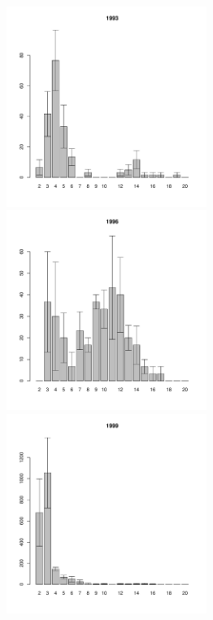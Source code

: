 \documentclass[12pt, a4paper]{article}
\begin{document}
\begin{figure}[h]
\begin{multicols}{3}
\end{multicols}



\begin{multicols}{3}
\hfill
\includegraphics[width=65mm]{../White_Sea/Estuatiy_Luvenga/sizestr2_1993_.pdf}
\hfill
\includegraphics[width=65mm]{../White_Sea/Estuatiy_Luvenga/sizestr2_1996_.pdf}
\hfill
\includegraphics[width=65mm]{../White_Sea/Estuatiy_Luvenga/sizestr2_1999_.pdf}

\end{multicols}



\end{figure}
\end{document}
